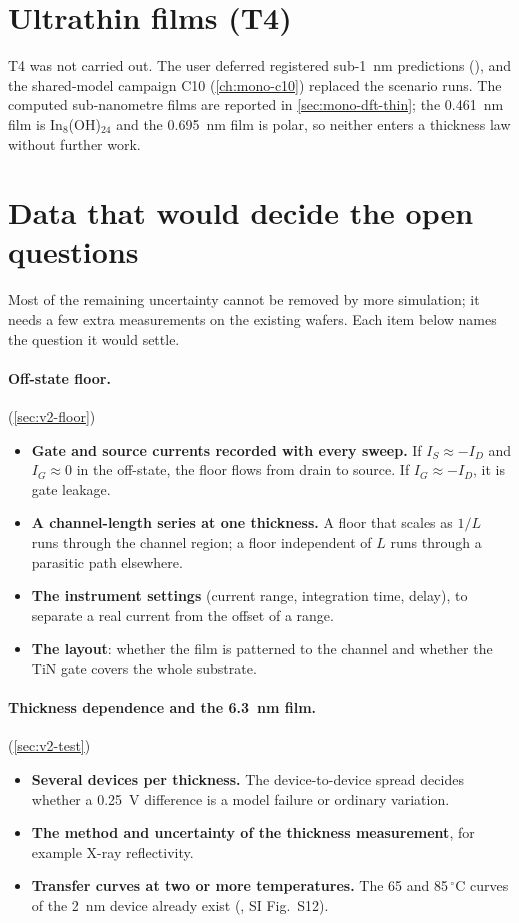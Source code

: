 \section{Ultrathin films (T4)}
\label{sec:v2-thin}
T4 was not carried out. The user deferred registered sub-1~nm predictions (), and the shared-model
campaign C10 (\cref{ch:mono-c10}) replaced the scenario runs. The computed sub-nanometre films are reported in
\cref{sec:mono-dft-thin}; the 0.461~nm film is In$_8$(OH)$_{24}$ and the 0.695~nm film is polar, so neither enters a
thickness law without further work.

\section{Data that would decide the open questions}
\label{sec:v2-data}

\begin{v2plain}
Most of the remaining uncertainty cannot be removed by more simulation; it needs a few extra measurements on the
existing wafers. Each item below names the question it would settle.
\end{v2plain}

\paragraph{Off-state floor.} (\cref{sec:v2-floor})
\begin{itemize}
\item \textbf{Gate and source currents recorded with every sweep.} If $I_S \approx -I_D$ and $I_G \approx 0$ in the
off-state, the floor flows from drain to source. If $I_G \approx -I_D$, it is gate leakage.
\item \textbf{A channel-length series at one thickness.} A floor that scales as $1/L$ runs through the channel region;
a floor independent of $L$ runs through a parasitic path elsewhere.
\item \textbf{The instrument settings} (current range, integration time, delay), to separate a real current from the
offset of a range.
\item \textbf{The layout}: whether the film is patterned to the channel and whether the TiN gate covers the whole
substrate.
\end{itemize}

\paragraph{Thickness dependence and the 6.3~nm film.} (\cref{sec:v2-test})
\begin{itemize}
\item \textbf{Several devices per thickness.} The device-to-device spread decides whether a 0.25~V difference is a
model failure or ordinary variation.
\item \textbf{The method and uncertainty of the thickness measurement}, for example X-ray reflectivity.
\item \textbf{Transfer curves at two or more temperatures.} The 65 and 85\,$^\circ$C curves of the 2~nm device
already exist (\citet{Januar2026}, SI Fig.~S12).
\end{itemize}

